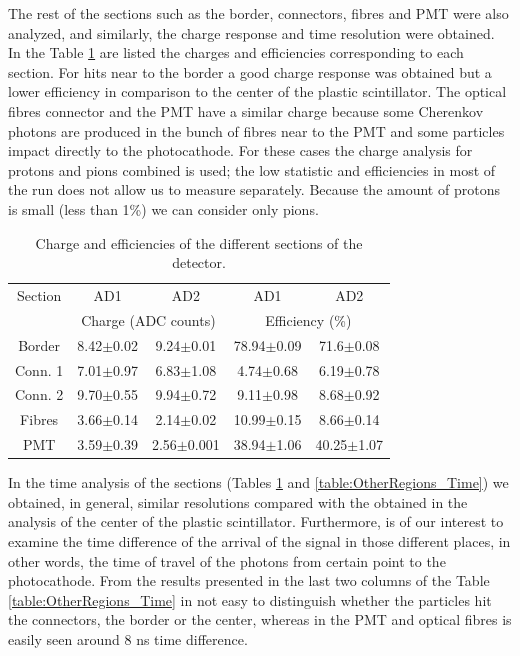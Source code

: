 	The rest of the sections such as the border, connectors, fibres and PMT were also analyzed, and similarly, the charge response and time resolution were obtained. In the Table \ref{table:OtherRegions} are	listed the charges and efficiencies corresponding to each section. For hits near to the border a good charge response was obtained but a lower efficiency in comparison to the center of the plastic scintillator. 
	The optical fibres connector and the PMT have a similar charge because some Cherenkov  photons are produced in the bunch of fibres near to the PMT and some particles impact directly to the photocathode. %
	For these cases the charge analysis for protons and pions combined is used; the low statistic and efficiencies in most of the run does not allow us to measure separately. Because the amount of protons is small (less than 1\%) we can consider only pions.

    \begin{table}[h!]
      \centering
      \begin{tabular}{|c||c c|c c|}
	 \hline
	Section  & 	AD1&		AD2&		AD1&		AD2\\
		 & \multicolumn{2}{c|}{Charge (ADC counts)} &\multicolumn{2}{c|}{Efficiency (\%)}  \\ \hline \hline
	  Border &	8.42$\pm$0.02&	9.24$\pm$0.01&	78.94$\pm$0.09&	71.6$\pm$0.08\\
	  Conn. 1&	7.01$\pm$0.97&	6.83$\pm$1.08&	4.74$\pm$0.68&	6.19$\pm$0.78\\ 
	  Conn. 2&	9.70$\pm$0.55&	9.94$\pm$0.72&	9.11$\pm$0.98&	8.68$\pm$0.92\\ 	
	  Fibres&	3.66$\pm$0.14&	2.14$\pm$0.02&	10.99$\pm$0.15&	8.66$\pm$0.14\\
	  PMT	&       3.59$\pm$0.39&	2.56$\pm$0.001&	38.94$\pm$1.06&	40.25$\pm$1.07\\
	  \hline
	\end{tabular}
	\caption{Charge and efficiencies of the different sections of the detector.}
	\label{table:OtherRegions}
    \end{table}

	In the time analysis of the sections (Tables \ref{table:OtherRegions} and \ref{table:OtherRegions_Time}) we obtained, in general, similar resolutions compared with the obtained in the analysis of the center of the plastic scintillator.
	Furthermore, is of our interest to examine the time difference of the arrival of the signal in those different places, in other words, the time of travel of the photons from certain point to the photocathode. From the results presented in the last two columns of the Table \ref{table:OtherRegions_Time} in not easy to distinguish whether the particles hit the connectors, the border or the center, whereas in the PMT and optical fibres is easily seen around 8 ns time difference. %
	
